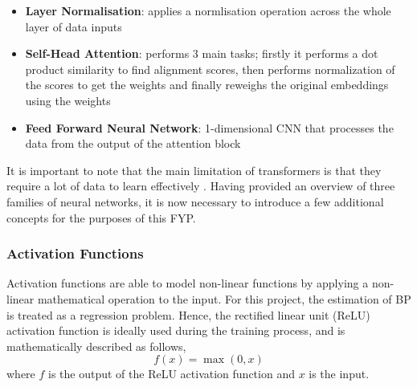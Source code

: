 \begin{itemize}
    \item \textbf{Layer Normalisation}: applies a normlisation operation across the whole layer of data inputs
    \item \textbf{Self-Head Attention}: performs 3 main tasks; firstly it performs a dot product similarity to find alignment scores, then performs normalization of the scores to get the weights and finally reweighs the original embeddings using the weights
    \item \textbf{Feed Forward Neural Network}: 1-dimensional CNN that processes the data from the output of the attention block
\end{itemize}\noindent It is important to note that the main limitation of transformers is that 
they require a lot of data to learn effectively \cite{transformers}. Having provided an overview of three families of neural networks, it is now necessary to introduce a few additional concepts for the purposes of this FYP.

\subsubsection{Activation Functions}
Activation functions are able to model non-linear functions by applying a non-linear mathematical operation to the input. For this project, the estimation of BP is treated as a regression problem. 
Hence, the rectified linear unit (ReLU) activation function is ideally used during the training process, and is mathematically described as follows,
\begin{equation}
    f(x) = \max(0,x)
\end{equation}\noindent where $f$ is the output of the ReLU activation function 
and $x$ is the input.

